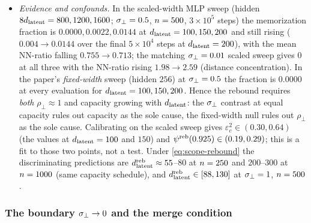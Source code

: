 \begin{remark}
\begin{itemize}
\item[(iii)] \emph{Evidence and confounds.} In the scaled-width MLP sweep (hidden $8d_{\mathrm{latent}}=800,1200,1600$; $\sigma_{\perp}=0.5$, $n=500$, $3\times10^5$ steps) the memorization fraction is $0.0000,0.0022,0.0144$ at $d_{\mathrm{latent}}=100,150,200$ and still rising ($0.004\to0.0144$ over the final $5\times10^4$ steps at $d_{\mathrm{latent}}=200$), with the mean NN-ratio falling $0.755\to0.713$; the matching $\sigma_{\perp}=0.01$ scaled sweep gives $0$ at all three with the NN-ratio rising $1.98\to2.59$ (distance concentration). In the paper's \emph{fixed-width} sweep (hidden $256$) at $\sigma_{\perp}=0.5$ the fraction is $0.0000$ at every evaluation for $d_{\mathrm{latent}}=100,150,200$. Hence the rebound requires \emph{both} $\rho_\perp\approx1$ and capacity growing with $d_{\mathrm{latent}}$: the $\sigma_{\perp}$ contrast at equal capacity rules out capacity as the sole cause, the fixed-width null rules out $\rho_\perp$ as the sole cause. Calibrating on the scaled sweep gives $\varepsilon_c^2\in(0.30,0.64)$ (the values at $d_{\mathrm{latent}}=100$ and $150$) and $\psi^{\rm reb}(0.925)\in(0.19,0.29)$; this is a fit to those two points, not a test. Under \eqref{eq:scope-rebound} the discriminating predictions are $d_{\mathrm{latent}}^{\rm reb}\approx55$--$80$ at $n=250$ and $200$--$300$ at $n=1000$ (same capacity schedule), and $d_{\mathrm{latent}}^{\rm reb}\in[88,130]$ at $\sigma_{\perp}=1$, $n=500$.
\end{itemize}
\end{remark}

\subsubsection{The boundary $\sigma_{\perp}\to0$ and the merge condition}

